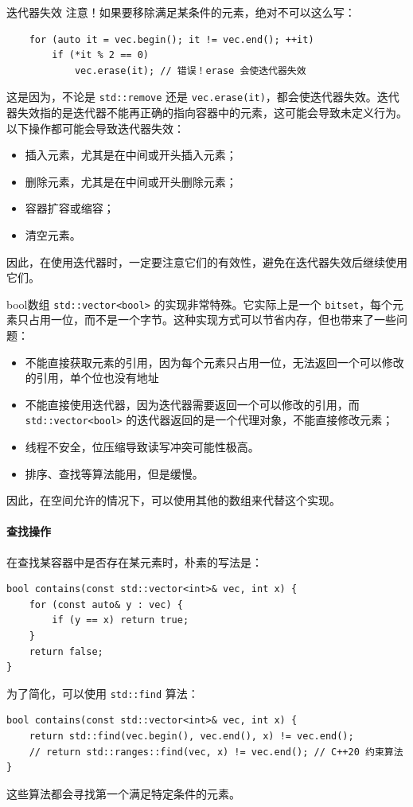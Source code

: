 \begin{remark}{迭代器失效}
    注意！如果要移除满足某条件的元素，绝对不可以这么写：
    \begin{verbatim}
    for (auto it = vec.begin(); it != vec.end(); ++it) 
        if (*it % 2 == 0) 
            vec.erase(it); // 错误！erase 会使迭代器失效
    \end{verbatim}
    这是因为，不论是 \verb|std::remove| 还是 \verb|vec.erase(it)|，都会使迭代器失效。迭代器失效指的是迭代器不能再正确的指向容器中的元素，这可能会导致未定义行为。以下操作都可能会导致迭代器失效：
    \begin{itemize}
        \item 插入元素，尤其是在中间或开头插入元素；
        \item 删除元素，尤其是在中间或开头删除元素；
        \item 容器扩容或缩容；
        \item 清空元素。
    \end{itemize}
    因此，在使用迭代器时，一定要注意它们的有效性，避免在迭代器失效后继续使用它们。
\end{remark}

\begin{remark}{bool数组}
    \verb|std::vector<bool>| 的实现非常特殊。它实际上是一个 \verb|bitset|，每个元素只占用一位，而不是一个字节。这种实现方式可以节省内存，但也带来了一些问题：
    \begin{itemize}
        \item 不能直接获取元素的引用，因为每个元素只占用一位，无法返回一个可以修改的引用，单个位也没有地址
        \item 不能直接使用迭代器，因为迭代器需要返回一个可以修改的引用，而 \verb|std::vector<bool>| 的迭代器返回的是一个代理对象，不能直接修改元素；
        \item 线程不安全，位压缩导致读写冲突可能性极高。
        \item 排序、查找等算法能用，但是缓慢。
    \end{itemize}
    因此，在空间允许的情况下，可以使用其他的数组来代替这个实现。
\end{remark}


\paragraph{查找操作} 在查找某容器中是否存在某元素时，朴素的写法是：
\begin{verbatim}
bool contains(const std::vector<int>& vec, int x) {
    for (const auto& y : vec) {
        if (y == x) return true;
    }
    return false;
}
\end{verbatim}
为了简化，可以使用 \verb|std::find| 算法：
\begin{verbatim}
bool contains(const std::vector<int>& vec, int x) {
    return std::find(vec.begin(), vec.end(), x) != vec.end();
    // return std::ranges::find(vec, x) != vec.end(); // C++20 约束算法
}
\end{verbatim}
这些算法都会寻找第一个满足特定条件的元素。

